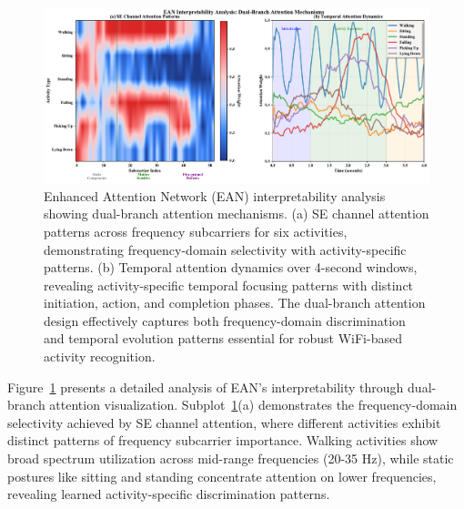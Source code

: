 \documentclass[lettersize,journal]{IEEEtran}
\begin{document}
\begin{figure}[t]
\centering
\includegraphics[width=\linewidth]{plots/fig6_interpretability_v3.pdf}
\caption{Enhanced Attention Network (EAN) interpretability analysis showing dual-branch attention mechanisms. (a) SE channel attention patterns across frequency subcarriers for six activities, demonstrating frequency-domain selectivity with activity-specific patterns. (b) Temporal attention dynamics over 4-second windows, revealing activity-specific temporal focusing patterns with distinct initiation, action, and completion phases. The dual-branch attention design effectively captures both frequency-domain discrimination and temporal evolution patterns essential for robust WiFi-based activity recognition.}
\label{fig:interpretability}
\end{figure}

Figure~\ref{fig:interpretability} presents a detailed analysis of EAN's interpretability through dual-branch attention visualization. Subplot~\ref{fig:interpretability}(a) demonstrates the frequency-domain selectivity achieved by SE channel attention, where different activities exhibit distinct patterns of frequency subcarrier importance. Walking activities show broad spectrum utilization across mid-range frequencies (20-35 Hz), while static postures like sitting and standing concentrate attention on lower frequencies, revealing learned activity-specific discrimination patterns.
\end{document}
